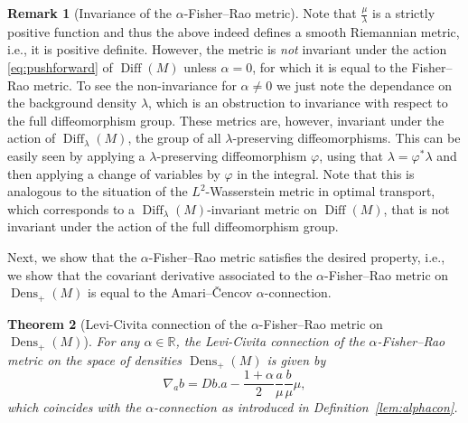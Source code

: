 \documentclass[11pt,reqno]{amsart}
\newtheorem{theorem}{Theorem}[section]
\theoremstyle{definition}
\newtheorem{remark}[theorem]{Remark}
\newcommand{\dx}{\lambda}
\newcommand{\Dens}{\operatorname{Dens}_+(M)}
\newcommand{\Diff}{\operatorname{Diff}(M)}
\newcommand{\orange}[1]{{\color{orange}#1}}
\begin{document}
\begin{remark}[Invariance of the $\alpha$-Fisher--Rao metric]
Note that $\frac{\mu}{\dx}$ is a strictly positive function and thus the above indeed defines a smooth Riemannian metric, i.e., it is positive definite.
However, the metric is \emph{not} invariant under the action \eqref{eq:pushforward} of $\Diff$ %
unless $\alpha=0$, for which it is equal to the Fisher--Rao metric. 
To see the non-invariance for $\alpha\neq 0$ we just note the dependance on the background density $\lambda$, which is an obstruction to invariance with respect to the full diffeomorphism group. 
These metrics are, however, invariant under the action of $\operatorname{Diff}_{\lambda}(M)$, the group of all $\lambda$-preserving diffeomorphisms. 
This can be easily seen by applying a $\lambda$-preserving diffeomorphism $\varphi$, using that $\lambda = \varphi^*\lambda$ and then applying a change of variables by $\varphi$ in the integral. 
Note that this is analogous to the situation of the $L^2$-Wasserstein metric in optimal transport, which corresponds to a $\operatorname{Diff}_{\lambda}(M)$-invariant metric on $\Diff$, that is not invariant under the action of the full diffeomorphism group. 
\end{remark}

Next, we show that the $\alpha$-Fisher--Rao metric satisfies the desired property, i.e., we show that the covariant derivative %
associated to the $\alpha$-Fisher--Rao metric on $\Dens$ is equal to the Amari--\v{C}encov $\alpha$-connection.
\begin{theorem}[Levi-Civita connection of the $\alpha$-Fisher--Rao metric on $\Dens$]%
\label{thm:alphaFR_connection_dens}
For any $\alpha\in \mathbb R$, the Levi-Civita connection of the $\alpha$-Fisher--Rao metric on the space of densities $\Dens$ is given by
\begin{equation*}
\nabla_a b = Db.a  -\frac{1+\alpha}{2} \frac{a}{\mu}\frac{b}{\mu} \mu,
\end{equation*}
which coincides with the  $\alpha$-connection as introduced in Definition~\ref{lem:alphacon}.
\end{theorem}
\end{document}

